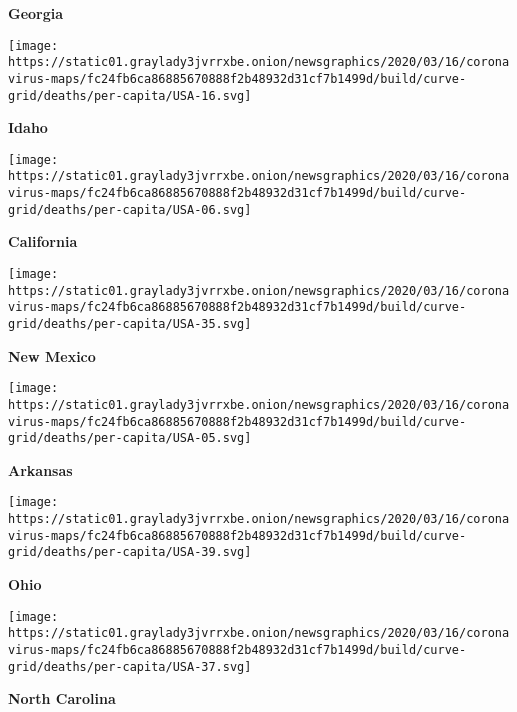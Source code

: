 \textbf{Georgia}

\href{https://www.nytimes3xbfgragh.onion/interactive/2020/us/idaho-coronavirus-cases.html}{}

\texttt{[image: https://static01.graylady3jvrrxbe.onion/newsgraphics/2020/03/16/coronavirus-maps/fc24fb6ca86885670888f2b48932d31cf7b1499d/build/curve-grid/deaths/per-capita/USA-16.svg]}

\textbf{Idaho}

\href{https://www.nytimes3xbfgragh.onion/interactive/2020/us/california-coronavirus-cases.html}{}

\texttt{[image: https://static01.graylady3jvrrxbe.onion/newsgraphics/2020/03/16/coronavirus-maps/fc24fb6ca86885670888f2b48932d31cf7b1499d/build/curve-grid/deaths/per-capita/USA-06.svg]}

\textbf{California}

\href{https://www.nytimes3xbfgragh.onion/interactive/2020/us/new-mexico-coronavirus-cases.html}{}

\texttt{[image: https://static01.graylady3jvrrxbe.onion/newsgraphics/2020/03/16/coronavirus-maps/fc24fb6ca86885670888f2b48932d31cf7b1499d/build/curve-grid/deaths/per-capita/USA-35.svg]}

\textbf{New Mexico}

\href{https://www.nytimes3xbfgragh.onion/interactive/2020/us/arkansas-coronavirus-cases.html}{}

\texttt{[image: https://static01.graylady3jvrrxbe.onion/newsgraphics/2020/03/16/coronavirus-maps/fc24fb6ca86885670888f2b48932d31cf7b1499d/build/curve-grid/deaths/per-capita/USA-05.svg]}

\textbf{Arkansas}

\href{https://www.nytimes3xbfgragh.onion/interactive/2020/us/ohio-coronavirus-cases.html}{}

\texttt{[image: https://static01.graylady3jvrrxbe.onion/newsgraphics/2020/03/16/coronavirus-maps/fc24fb6ca86885670888f2b48932d31cf7b1499d/build/curve-grid/deaths/per-capita/USA-39.svg]}

\textbf{Ohio}

\href{https://www.nytimes3xbfgragh.onion/interactive/2020/us/north-carolina-coronavirus-cases.html}{}

\texttt{[image: https://static01.graylady3jvrrxbe.onion/newsgraphics/2020/03/16/coronavirus-maps/fc24fb6ca86885670888f2b48932d31cf7b1499d/build/curve-grid/deaths/per-capita/USA-37.svg]}

\textbf{North Carolina}

